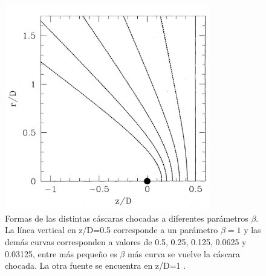 \documentclass{book}
\begin{document}
\begin{figure}[htb]
    \centering    \includegraphics[width=0.8\textwidth]{images Chapter 2/C2_Canto2.jpg}
    \caption{Formas de las distintas cáscaras chocadas a diferentes parámetros $\beta$. La línea vertical en z/D=0.5 corresponde a un parámetro $\beta=1$ y las demás curvas corresponden a valores de 0.5, 0.25, 0.125, 0.0625 y 0.03125, entre más pequeño es $\beta$ más curva se vuelve la cáscara chocada. La otra fuente se encuentra en z/D=1 \citep{Canto:1996}.}
    \label{fig:Canto2}
\end{figure}

\end{document}
